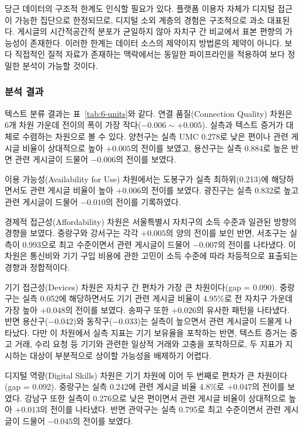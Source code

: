 당근 데이터의 구조적 한계도 인식할 필요가 있다. 플랫폼 이용자 자체가 디지털 접근이 가능한 집단으로 한정되므로, 디지털 소외 계층의 경험은 구조적으로 과소 대표된다. 게시글의 시간적\textperiodcentered{}공간적 분포가 균일하지 않아 자치구 간 비교에서 표본 편향의 가능성이 존재한다. 이러한 한계는 데이터 소스의 제약이지 방법론의 제약이 아니다. 보다 직접적인 질적 자료가 존재하는 맥락에서는 동일한 파이프라인을 적용하여 보다 정밀한 분석이 가능할 것이다.


\subsubsection{분석 결과}
\label{subsubsec:3-3-5}

텍스트 분류 결과는 표~\ref{tab:6-units}와 같다. 연결 품질(Connection Quality) 차원은 6개 차원 가운데 전이의 폭이 가장 작다($-0.006 \sim +0.005$). 실측과 텍스트 증거가 대체로 수렴하는 차원으로 볼 수 있다. 양천구는 실측 UMC 0.278로 낮은 편이나 관련 게시글 비율이 상대적으로 높아 $+0.005$의 전이를 보였고, 용산구는 실측 0.884로 높은 반면 관련 게시글이 드물어 $-0.006$의 전이를 보였다.

이용 가능성(Availability for Use) 차원에서는 도봉구가 실측 최하위(0.213)에 해당하면서도 관련 게시글 비율이 높아 $+0.006$의 전이를 보였다. 광진구는 실측 0.832로 높고 관련 게시글이 드물어 $-0.010$의 전이를 기록하였다.

경제적 접근성(Affordability) 차원은 서울특별시 자치구의 소득 수준과 일관된 방향의 경향을 보였다. 중랑구와 강서구는 각각 $+0.005$의 양의 전이를 보인 반면, 서초구는 실측이 0.993으로 최고 수준이면서 관련 게시글이 드물어 $-0.007$의 전이를 나타냈다. 이 차원은 통신비와 기기 구입 비용에 관한 고민이 소득 수준에 따라 차등적으로 표출되는 경향과 정합적이다.

기기 접근성(Devices) 차원은 자치구 간 편차가 가장 큰 차원이다(gap = 0.090). 중랑구는 실측 0.052에 해당하면서도 기기 관련 게시글 비율이 4.95\%로 전 자치구 가운데 가장 높아 $+0.048$의 전이를 보였다. 송파구 또한 $+0.026$의 유사한 패턴을 나타냈다. 반면 용산구($-0.042$)와 동작구($-0.033$)는 실측이 높으면서 관련 게시글이 드물게 나타났다. 다만 이 차원에서 실측 지표는 기기 보유율을 포착하는 반면, 텍스트 증거는 중고 거래, 수리 요청 등 기기와 관련한 일상적 거래와 고충을 포착하므로, 두 지표가 지시하는 대상이 부분적으로 상이할 가능성을 배제하기 어렵다.

디지털 역량(Digital Skills) 차원은 기기 차원에 이어 두 번째로 편차가 큰 차원이다(gap = 0.092). 중랑구는 실측 0.242에 관련 게시글 비율 4.8\%로 $+0.047$의 전이를 보였다. 강남구 또한 실측이 0.276으로 낮은 편이면서 관련 게시글 비율이 상대적으로 높아 $+0.013$의 전이를 나타냈다. 반면 관악구는 실측 0.795로 최고 수준이면서 관련 게시글이 드물어 $-0.045$의 전이를 보였다.

